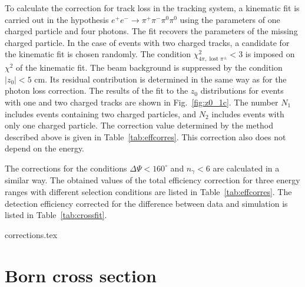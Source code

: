 \documentclass[twocolumn,aps,prd,floatfix,nofootinbib,superscriptaddress]{revtex4-2}
\begin{document}
To calculate the correction for track loss in the tracking system, a kinematic fit is carried out in the hypothesis \( e^+e^- \to \pi^+\pi^-\pi^0\pi^0 \) using the parameters of one charged particle and four photons.
The fit recovers the parameters of the missing charged particle.
In the case of events with two charged tracks, a candidate for the kinematic fit is
chosen randomly.
The condition \( \chi^2_{4\pi,\text{ lost }\pi^\pm} < 3 \) is imposed on $\chi^2$ of the kinematic fit.
The beam background is suppressed by the condition \( |z_0| < 5 \) cm.
Its residual contribution is determined in the same way as for the photon loss correction.
The results of the fit to the $z_0$ distributions for events with one and two charged tracks are shown in Fig.~\ref{fig:z0_1c}.
The number $N_1$ includes events containing two charged particles, and $N_2$ includes events with only one charged particle.
The correction value determined by the method described above is given in Table~\ref{tab:effcorres}.
This correction also does not depend on the energy.

The corrections for the conditions \( \Delta\Psi < 160^\circ \) and \( n_\gamma < 6 \) are calculated in a similar way.
The obtained values of the total efficiency correction for three energy ranges with different selection conditions are listed in Table~\ref{tab:effcorres}.
The detection efficiency corrected for the difference between data and simulation is listed in Table~\ref{tab:crossfit}.

\begin{table}
\caption{The corrections to the detection efficiency.}
\label{tab:effcorres}
\begin{ruledtabular}
{corrections.tex}
\end{ruledtabular}
\end{table}

\section{Born cross section}
\label{sec:borncross}
\end{document}
